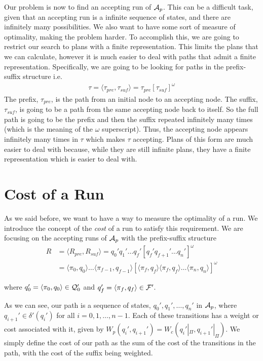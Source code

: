 Our problem is now to find an accepting run of $\mathcal{A}_p$. This can be a difficult task, given that an accepting run is a infinite sequence of states, and there are infinitely many possibilities. We also want to have some sort of measure of optimality, making the problem harder. To accomplish this, we are going to restrict our search to plans with a finite representation. This limits the plans that we can calculate, however it is much easier to deal with paths that admit a finite representation. Specifically, we are going to be looking for paths in the prefix-suffix structure i.e.\
\begin{align*}
\tau = \langle \tau_{pre}, \tau_{suf} \rangle = \tau_{pre} [\tau_{suf}]^\omega
\end{align*}
The prefix, $\tau_{pre}$, is the path from an initial node to an accepting node. The suffix, $\tau_{suf}$, is going to be a path from the same accepting node back to itself. So the full path is going to be the prefix and then the suffix repeated infinitely many times (which is the meaning of the $\omega$ superscript). Thus, the accepting node appears infinitely many times in $\tau$ which makes $\tau$ accepting. Plans of this form are much easier to deal with because, while they are still infinite plans, they have a finite representation which is easier to deal with.

\section{Cost of a Run}
As we said before, we want to have a way to measure the optimality of a run. We introduce the concept of the \textit{cost} of a run to satisfy this requirement. We are focusing on the accepting runs of $\mathcal{A}_p$ with the prefix-suffix structure
\begin{align*}
R &= \langle R_{pre}, R_{suf} \rangle = q_0' q_1' \dots q_f' [q_f' q_{f+1}' \dots q_n']^\omega \\
&= \langle \pi_0, q_0 \rangle \dots \langle \pi_{f-1}, q_{f-1} \rangle [ \langle \pi_f , q_f \rangle \langle \pi_f , q_f \rangle \dots \langle \pi_{n}, q_n \rangle ]^\omega
\end{align*} 

where $q_0' = \langle \pi_0, q_0 \rangle \in \mathcal{Q}_0'$ and $q_f' = \langle \pi_f , q_f \rangle \in \mathcal{F}'$. 

As we can see, our path is a sequence of states, $q_0',q_1',\dots,q_n'$ in $\mathcal{A}_p$, where $q_{i+1}' \in \delta' (q_i')$ for all $i=0,1, \dots, n-1$. Each of these transitions has a weight or cost associated with it, given by $W_p(q_i',q_{i+1}') = W_c(q_i'|_\Pi , q_{i+1}'|_\Pi)$. We simply define the cost of our path as the sum of the cost of the transitions in the path, with the cost of the suffix being weighted.

